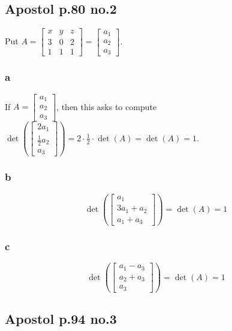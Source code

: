 \documentclass[12pt,letterpaper]{article}
\theoremstyle{definition}
\begin{document}
\subsection*{Apostol p.80 no.2}

Put $A = \begin{bmatrix} x & y & z \\ 3 & 0 & 2 \\ 1 & 1 & 1 \end{bmatrix} = \begin{bmatrix} a_1 \\ a_2 \\ a_3 \end{bmatrix}$. 

\subsubsection*{a}

If $A = \begin{bmatrix} a_1 \\ a_2 \\ a_3 \end{bmatrix}$, then this asks to
compute $\det(\begin{bmatrix} 2a_1 \\ \frac{1}{2}a_2 \\ a_3 \end{bmatrix}) = 2
\cdot \frac{1}{2} \cdot \det(A) = \det(A) = 1$.

\subsubsection*{b}

\[
  \det(\begin{bmatrix} a_1 \\ 3a_1 + a_2 \\ a_1 + a_3 \end{bmatrix}) = \det(A) = 1
\]

\subsubsection*{c}

\[
  \det(\begin{bmatrix} a_1 - a_3 \\ a_2 + a_3 \\ a_3 \end{bmatrix}) = \det(A) = 1
\]

\subsection*{Apostol p.94 no.3}
\end{document}
